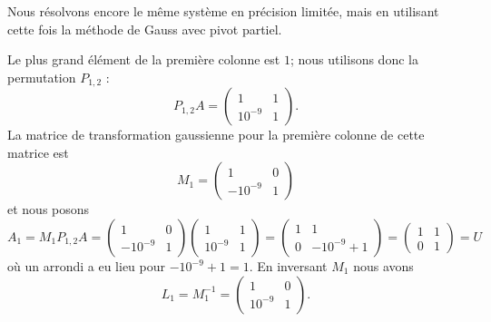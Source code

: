 \begin{example}     \label{EXooNCRSooTfmPFr}
    Nous résolvons encore le même système en précision limitée, mais en utilisant cette fois la méthode de Gauss avec pivot partiel.

    Le plus grand élément de la première colonne est \( 1\); nous utilisons donc la permutation \( P_{1,2}\) :
    \begin{equation}
        P_{1,2}A=\begin{pmatrix}
            1    &   1    \\
            10^{-9}    &       1
        \end{pmatrix}.
    \end{equation}
    La matrice de transformation gaussienne pour la première colonne de cette matrice est
    \begin{equation}
        M_1=\begin{pmatrix}
            1    &   0    \\
            -10^{-9}    &  1
        \end{pmatrix}
    \end{equation}
    et nous posons
    \begin{equation}
        A_1=M_1P_{1,2}A=
        \begin{pmatrix}
            1    &   0    \\
            -10^{-9}    &   1
        \end{pmatrix}
        \begin{pmatrix}
            1    &   1    \\
            10^{-9}    &   1
        \end{pmatrix}
        =\begin{pmatrix}
            1    &   1    \\
            0    &   -10^{-9}+1
        \end{pmatrix}=
        \begin{pmatrix}
            1    &   1    \\
            0    &   1
        \end{pmatrix}=U
    \end{equation}
    où un arrondi a eu lieu pour \( -10^{-9}+1=1\). En inversant \( M_1\) nous avons
    \begin{equation}
        L_1=M_1^{-1}=\begin{pmatrix}
            1    &   0    \\
            10^{-9}    &   1
        \end{pmatrix}.

\end{equation}
\end{example}
